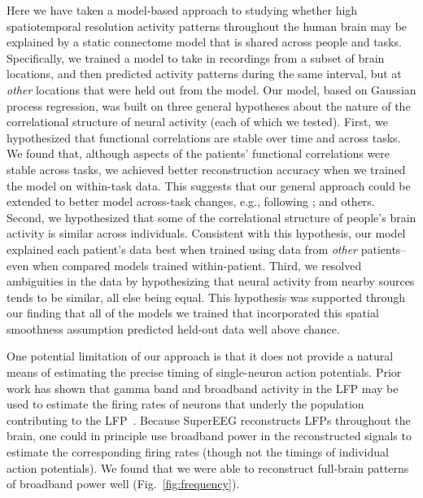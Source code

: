 \documentclass[11pt]{article}
\begin{document}
Here we have taken a model-based approach to studying whether high
spatiotemporal resolution activity patterns throughout the human brain may be
explained by a static connectome model that is shared across people and tasks.
Specifically, we trained a model to take in recordings from a subset of brain
locations, and then predicted activity patterns during the same interval, but at
\textit{other} locations that were held out from the model.  Our model, based on
Gaussian process regression, was built on three general hypotheses about the
nature of the correlational structure of neural activity (each of which we
tested).  First, we hypothesized that functional correlations are stable over
time and across tasks.  We found that, although aspects of the patients'
functional correlations were stable across tasks, we achieved better
reconstruction accuracy when we trained the model on within-task data. This
suggests that our general approach could be extended to better model across-task
changes, e.g., following \cite{ColeEtal16, TavoEtal16}; and others. Second, we
hypothesized that some of the correlational structure of people's brain activity
is similar across individuals.  Consistent with this hypothesis, our model
explained each patient's data best when trained using data from \textit{other}
patients-- even when compared models trained within-patient. Third, we
resolved ambiguities in the data by hypothesizing that neural activity from
nearby sources tends to be similar, all else being equal.  This hypothesis
was supported through our finding that all of the models we trained that
incorporated this spatial smoothness assumption predicted held-out data well
above chance.

One potential limitation of our approach is that it does not provide a natural
means of estimating the precise timing of single-neuron action potentials. Prior
work has shown that gamma band and broadband activity in the LFP may be used to
estimate the firing rates of neurons that underly the population contributing to
the LFP~\citep{MillEtal08, MannEtal09, JacoEtal10b, CronEtal11}. Because
SuperEEG reconstructs LFPs throughout the brain, one could in principle use
broadband power in the reconstructed signals to estimate the corresponding
firing rates (though not the timings of individual action potentials).  We found
that we were able to reconstruct full-brain patterns of broadband power well
(Fig.~\ref{fig:frequency}).
\end{document}
